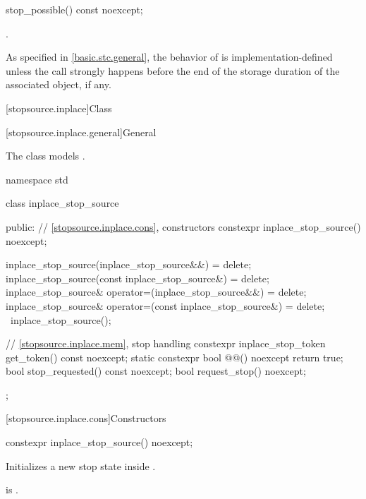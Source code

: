 %
\begin{itemdecl}
stop_possible() const noexcept;
\end{itemdecl}

\begin{itemdescr}
\pnum
\returns
{}.

\pnum
\begin{note}
As specified in \ref{basic.stc.general},
the behavior of  is implementation-defined
unless the call strongly happens before
the end of the storage duration of
the associated  object, if any.
\end{note}
\end{itemdescr}

[stopsource.inplace]{Class }

[stopsource.inplace.general]{General}

\pnum
The class  models .

%
\begin{codeblock}
namespace std {
  class inplace_stop_source {
  public:
    // \ref{stopsource.inplace.cons}, constructors
    constexpr inplace_stop_source() noexcept;

    inplace_stop_source(inplace_stop_source&&) = delete;
    inplace_stop_source(const inplace_stop_source&) = delete;
    inplace_stop_source& operator=(inplace_stop_source&&) = delete;
    inplace_stop_source& operator=(const inplace_stop_source&) = delete;
    ~inplace_stop_source();

    // \ref{stopsource.inplace.mem}, stop handling
    constexpr inplace_stop_token get_token() const noexcept;
    static constexpr bool @@() noexcept { return true; }
    bool stop_requested() const noexcept;
    bool request_stop() noexcept;
  };
}
\end{codeblock}

[stopsource.inplace.cons]{Constructors}

%
\begin{itemdecl}
constexpr inplace_stop_source() noexcept;
\end{itemdecl}

\begin{itemdescr}
\pnum
\effects
Initializes a new stop state inside .

\pnum
\ensures
{} is .
\end{itemdescr}

